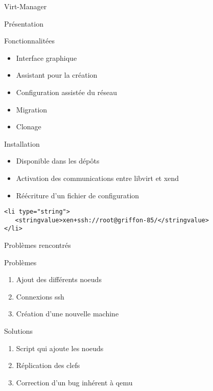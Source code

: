 
\begin{frame}
  \begin{center}
   \huge{Virt-Manager}
  \end{center}
\end{frame}

\begin{frame}{Présentation}
  \begin{block}{Fonctionnalitées}
    \begin{itemize}
    \item Interface graphique
      \pause
    \item Assistant pour la création
      \pause
    \item Configuration assistée du réseau
      \pause
    \item Migration
      \pause
    \item Clonage
    \end{itemize}
  \end{block}
\end{frame}
\begin{frame}[fragile]{Installation}
  \begin{itemize}
    \item Disponible dans les dépôts
\pause
    \item Activation des communications entre libvirt et xend
\pause
    \item Réécriture d'un fichier de configuration
  \end{itemize}
\begin{lstlisting}
<li type="string">
   <stringvalue>xen+ssh://root@griffon-85/</stringvalue>
</li>
\end{lstlisting}
\end{frame}
\begin{frame}{Problèmes rencontrés}
 \begin{alertblock}{Problèmes}
   \begin{enumerate}
     \item Ajout des différents noeuds
       \pause
     \item Connexions ssh
       \pause
     \item Création d'une nouvelle machine
       \pause
   \end{enumerate}
 \end{alertblock}
\pause
 \begin{exampleblock}{Solutions}
   \begin{enumerate}
     \item Script qui ajoute les noeuds
       \pause
     \item Réplication des clefs
       \pause
     \item Correction d'un bug inhérent à qemu
   \end{enumerate}
 \end{exampleblock}
\end{frame}



